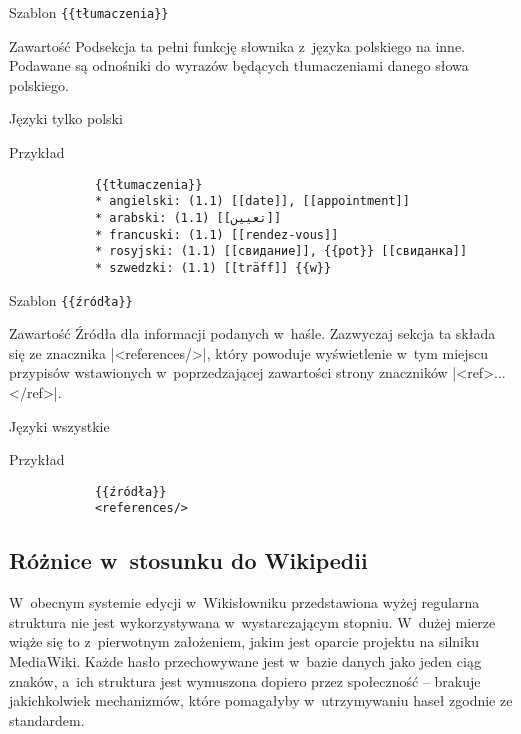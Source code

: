 \documentclass{pracamgr}
\begin{document}
\spacer
\begin{opis}
	\item[Szablon] \verb|{{tłumaczenia}}|
	\item[Zawartość] Podsekcja ta pełni funkcję słownika z~języka polskiego na inne. Podawane są odnośniki do wyrazów będących tłumaczeniami danego słowa polskiego.
	\item[Języki] tylko polski
	\item[Przykład]
		\begin{verbatim}
			{{tłumaczenia}}
			* angielski: (1.1) [[date]], [[appointment]]
			* arabski: (1.1) [[تعيين]]
			* francuski: (1.1) [[rendez-vous]]
			* rosyjski: (1.1) [[свидание]], {{pot}} [[свиданка]]
			* szwedzki: (1.1) [[träff]] {{w}}
		\end{verbatim}
\end{opis}
\spacer
\begin{opis}
	\item[Szablon] \verb|{{źródła}}|
	\item[Zawartość] Źródła dla informacji podanych w~haśle. Zazwyczaj sekcja ta składa się ze znacznika \kod|<references/>|, który powoduje wyświetlenie w~tym miejscu przypisów wstawionych w~poprzedzającej zawartości strony znaczników \kod|<ref>...</ref>|.
	\item[Języki] wszystkie
	\item[Przykład]
		\begin{verbatim}
			{{źródła}}
			<references/>
		\end{verbatim}
\end{opis}

\subsection{Różnice w~stosunku do Wikipedii}
W~obecnym systemie edycji w~Wikisłowniku przedstawiona wyżej regularna struktura nie jest wykorzystywana w~wystarczającym stopniu. W~dużej mierze wiąże się to z~pierwotnym założeniem, jakim jest oparcie projektu na silniku MediaWiki. Każde hasło przechowywane jest w~bazie danych jako jeden ciąg znaków, a~ich struktura jest wymuszona dopiero przez społeczność -- brakuje jakichkolwiek mechanizmów, które pomagałyby w~utrzymywaniu haseł zgodnie ze standardem.
\end{document}
